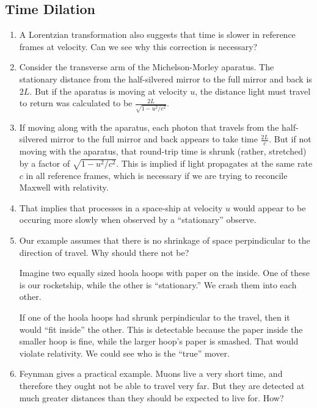 \subsection{Time Dilation}

\begin{enumerate}

  \item A Lorentzian transformation also suggests that time is slower in
  reference frames at velocity. Can we see why this correction is
  necessary?

  \item Consider the transverse arm of the Michelson-Morley aparatus.
  The stationary distance from the half-silvered mirror to the full
  mirror and back is $2L$. But if the aparatus is moving at velocity
  $u$, the distance light must travel to return was calculated to be
  $\frac{2L}{\sqrt{1 - u^2/c^2}}$.

  \item If moving along with the aparatus, each photon that travels from
  the half-silvered mirror to the full mirror and back appears to take
  time $\frac{2L}{c}$. But if not moving with the aparatus, that
  round-trip time is shrunk (rather, stretched) by a factor of $\sqrt{1
  - u^2/c^2}$. This is implied if light propagates at the same rate $c$
  in all reference frames, which is necessary if we are trying to
  reconcile Maxwell with relativity.

  \item That implies that processes in a space-ship at velocity $u$
  would appear to be occuring more slowly when observed by a
  ``stationary'' observe.

  \item Our example assumes that there is no shrinkage of space
  perpindicular to the direction of travel. Why should there not be?

  Imagine two equally sized hoola hoops with paper on the inside. One of
  these is our rocketship, while the other is ``stationary.'' We crash
  them into each other.

  If one of the hoola hoops had shrunk perpindicular to the travel, then
  it would ``fit inside'' the other. This is detectable because the
  paper inside the smaller hoop is fine, while the larger hoop's paper
  is smashed. That would violate relativity. We could see who is the
  ``true'' mover.

  \item Feynman gives a practical example. Muons live a very short time,
  and therefore they ought not be able to travel very far. But they are
  detected at much greater distances than they should be expected to
  live for. How?


\end{enumerate}
